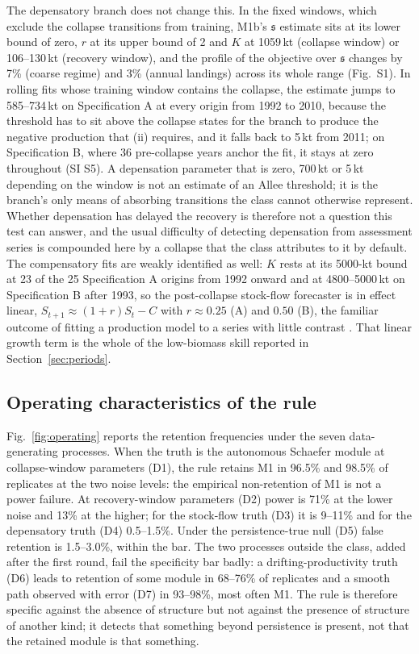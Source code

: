 \documentclass[preprint,11pt,authoryear]{elsarticle}
\theoremstyle{definition}
\theoremstyle{remark}
\newcommand{\sA}{\mathfrak{s}}
\begin{document}
The depensatory branch does not change this. In the fixed windows, which exclude the collapse transitions from training, M1b's $\sA$ estimate sits at its lower bound of zero, $r$ at its upper bound of 2 and $K$ at 1059\,kt (collapse window) or 106--130\,kt (recovery window), and the profile of the objective over $\sA$ changes by 7\% (coarse regime) and 3\% (annual landings) across its whole range (Fig.~S1). In rolling fits whose training window contains the collapse, the estimate jumps to 585--734\,kt on Specification A at every origin from 1992 to 2010, because the threshold has to sit above the collapse states for the branch to produce the negative production that (ii) requires, and it falls back to 5\,kt from 2011; on Specification B, where 36 pre-collapse years anchor the fit, it stays at zero throughout (SI S5). A depensation parameter that is zero, 700\,kt or 5\,kt depending on the window is not an estimate of an Allee threshold; it is the branch's only means of absorbing transitions the class cannot otherwise represent. Whether depensation has delayed the recovery \citep{Shelton1999,Hutchings1996,Rose2026} is therefore not a question this test can answer, and the usual difficulty of detecting depensation from assessment series \citep{Myers1995,Liermann1997} is compounded here by a collapse that the class attributes to it by default. The compensatory fits are weakly identified as well: $K$ rests at its 5000-kt bound at 23 of the 25 Specification A origins from 1992 onward and at 4800--5000\,kt on Specification B after 1993, so the post-collapse stock-flow forecaster is in effect linear, $S_{t+1}\approx(1+r)S_t - C$ with $r\approx 0.25$ (A) and $0.50$ (B), the familiar outcome of fitting a production model to a series with little contrast \citep{HilbornWalters1992,LudwigWalters1985,Polacheck1993}. That linear growth term is the whole of the low-biomass skill reported in Section~\ref{sec:periods}.

\FloatBarrier
\subsection{Operating characteristics of the rule}\label{sec:operating}

Fig.~\ref{fig:operating} reports the retention frequencies under the seven data-generating processes. When the truth is the autonomous Schaefer module at collapse-window parameters (D1), the rule retains M1 in 96.5\% and 98.5\% of replicates at the two noise levels: the empirical non-retention of M1 is not a power failure. At recovery-window parameters (D2) power is 71\% at the lower noise and 13\% at the higher; for the stock-flow truth (D3) it is 9--11\% and for the depensatory truth (D4) 0.5--1.5\%. Under the persistence-true null (D5) false retention is 1.5--3.0\%, within the bar. The two processes outside the class, added after the first round, fail the specificity bar badly: a drifting-productivity truth (D6) leads to retention of some module in 68--76\% of replicates and a smooth path observed with error (D7) in 93--98\%, most often M1. The rule is therefore specific against the absence of structure but not against the presence of structure of another kind; it detects that something beyond persistence is present, not that the retained module is that something.
\end{document}
